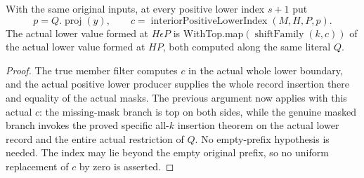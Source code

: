 \begin{theorem}
\label{hir:original-interior-full-family-positive-lower-value}
\leanok
{}
With the same original inputs, at every positive lower index $s+1$ put
\[
 p=Q.\operatorname{proj}(y),
 \qquad c=\operatorname{interiorPositiveLowerIndex}(M,H,P,p).
\]
The actual lower value formed at $H\epsilon P$ is
WithTop.map$(\operatorname{shiftFamily}(k,c))$ of the actual lower value
formed at $HP$, both computed along the same literal $Q$.
\end{theorem}
\begin{proof}
The true member filter computes $c$ in the actual whole lower boundary,
and the actual positive lower producer supplies the whole record insertion
there and equality of the actual masks.  The previous argument now applies
with this actual $c$: the missing-mask branch is top on both sides, while
the genuine masked branch invokes the proved specific all-$k$ insertion
theorem on the actual lower record and the entire actual restriction of
$Q$.  No empty-prefix hypothesis is needed.  The index may lie beyond the
empty original prefix, so no uniform replacement of $c$ by zero is asserted.
\end{proof}

